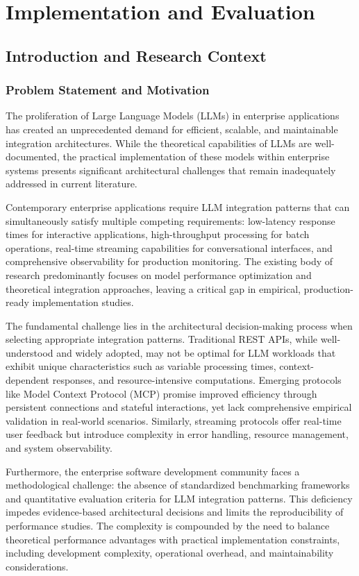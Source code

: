 \part{Implementation and Evaluation}

\chapter{Introduction and Research Context}

\section{Problem Statement and Motivation}

The proliferation of Large Language Models (LLMs) in enterprise applications has created an unprecedented demand for efficient, scalable, and maintainable integration architectures. While the theoretical capabilities of LLMs are well-documented, the practical implementation of these models within enterprise systems presents significant architectural challenges that remain inadequately addressed in current literature.

Contemporary enterprise applications require LLM integration patterns that can simultaneously satisfy multiple competing requirements: low-latency response times for interactive applications, high-throughput processing for batch operations, real-time streaming capabilities for conversational interfaces, and comprehensive observability for production monitoring. The existing body of research predominantly focuses on model performance optimization and theoretical integration approaches, leaving a critical gap in empirical, production-ready implementation studies.

The fundamental challenge lies in the architectural decision-making process when selecting appropriate integration patterns. Traditional REST APIs, while well-understood and widely adopted, may not be optimal for LLM workloads that exhibit unique characteristics such as variable processing times, context-dependent responses, and resource-intensive computations. Emerging protocols like Model Context Protocol (MCP) promise improved efficiency through persistent connections and stateful interactions, yet lack comprehensive empirical validation in real-world scenarios. Similarly, streaming protocols offer real-time user feedback but introduce complexity in error handling, resource management, and system observability.

Furthermore, the enterprise software development community faces a methodological challenge: the absence of standardized benchmarking frameworks and quantitative evaluation criteria for LLM integration patterns. This deficiency impedes evidence-based architectural decisions and limits the reproducibility of performance studies. The complexity is compounded by the need to balance theoretical performance advantages with practical implementation constraints, including development complexity, operational overhead, and maintainability considerations.

